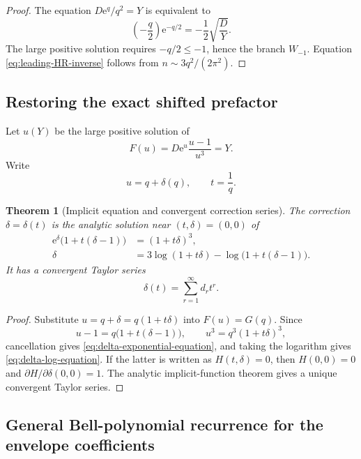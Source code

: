\documentclass[11pt]{article}
\numberwithin{equation}{section}
\theoremstyle{mainthm}
\newtheorem{theorem}{Theorem}[section]
\theoremstyle{defstyle}
\theoremstyle{remark}
\newcommand{\e}{\mathrm e}
\begin{document}
\begin{proof}
The equation \(D\e^q/q^2=Y\) is equivalent to
\[
 \left(-\frac q2\right)\e^{-q/2}=-\frac12\sqrt{\frac DY}.
\]
The large positive solution requires \(-q/2\le-1\), hence the branch \(W_{-1}\).  Equation \eqref{eq:leading-HR-inverse} follows from \(n\sim3q^2/(2\pi^2)\).
\end{proof}

\subsection{Restoring the exact shifted prefactor}

Let \(u(Y)\) be the large positive solution of
\begin{equation}\label{eq:F-u-Y}
 F(u)=D\e^u\frac{u-1}{u^3}=Y.
\end{equation}
Write
\begin{equation}\label{eq:u-q-delta}
 u=q+\delta(q),\qquad t=\frac1q.
\end{equation}

\begin{theorem}[Implicit equation and convergent correction series]\label{thm:delta-equation}
The correction \(\delta=\delta(t)\) is the analytic solution near \((t,\delta)=(0,0)\) of
\begin{align}
 \e^\delta\bigl(1+t(\delta-1)\bigr)&=(1+t\delta)^3,
 \label{eq:delta-exponential-equation}\\
 \delta&=3\log(1+t\delta)-\log\bigl(1+t(\delta-1)\bigr).
 \label{eq:delta-log-equation}
\end{align}
It has a convergent Taylor series
\begin{equation}\label{eq:delta-series}
 \delta(t)=\sum_{r=1}^{\infty}d_rt^r.
\end{equation}
\end{theorem}

\begin{proof}
Substitute \(u=q+\delta=q(1+t\delta)\) into \(F(u)=G(q)\).  Since
\[
 u-1=q\bigl(1+t(\delta-1)\bigr),
 \qquad u^3=q^3(1+t\delta)^3,
\]
cancellation gives \eqref{eq:delta-exponential-equation}, and taking the logarithm gives \eqref{eq:delta-log-equation}.  If the latter is written as \(H(t,\delta)=0\), then \(H(0,0)=0\) and \(\partial H/\partial\delta(0,0)=1\).  The analytic implicit-function theorem gives a unique convergent Taylor series.
\end{proof}

\subsection{General Bell-polynomial recurrence for the envelope coefficients}
\end{document}
